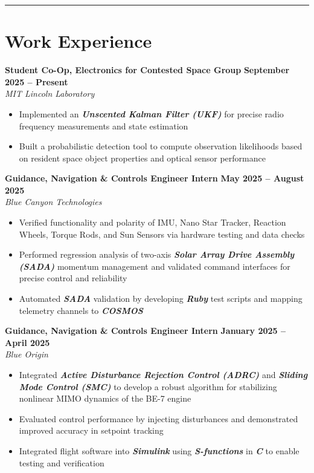 \documentclass[10pt]{article}
\newcommand{\sectionline}{\noindent\rule{\linewidth}{0.4pt}}
\begin{document}
	\sectionline
	
	\section*{Work Experience}
	
	\textbf{Student Co-Op, Electronics for Contested Space Group} \hfill \textbf{September 2025 – Present} \\
	\emph{MIT Lincoln Laboratory}
	\begin{itemize}
		\item Implemented an \textbf{\emph{Unscented Kalman Filter (UKF)}} for precise radio frequency measurements and state estimation
		\item Built a probabilistic detection tool to compute observation likelihoods based on resident space object properties and optical sensor performance
	\end{itemize}
	
	\textbf{Guidance, Navigation \& Controls Engineer Intern} \hfill \textbf{May 2025 – August 2025} \\
	\emph{Blue Canyon Technologies}
	\begin{itemize}
		\item Verified functionality and polarity of IMU, Nano Star Tracker, Reaction Wheels, Torque Rods, and Sun Sensors via hardware testing and data checks
		\item Performed regression analysis of two-axis \textbf{\emph{Solar Array Drive Assembly (SADA)}} momentum management and validated command interfaces for precise control and reliability
		\item Automated \textbf{\emph{SADA}} validation by developing \textbf{\emph{Ruby}} test scripts and mapping telemetry channels to \textbf{\emph{COSMOS}}
	\end{itemize}
	
	\textbf{Guidance, Navigation \& Controls Engineer Intern} \hfill \textbf{January 2025 – April 2025} \\
	\emph{Blue Origin}
	\begin{itemize}
		\item Integrated \textbf{\emph{Active Disturbance Rejection Control (ADRC)}} and \textbf{\emph{Sliding Mode Control (SMC)}} to develop a robust algorithm for stabilizing nonlinear MIMO dynamics of the BE-7 engine
		\item Evaluated control performance by injecting disturbances and demonstrated improved accuracy in setpoint tracking
		\item Integrated flight software into \textbf{\emph{Simulink}} using \textbf{\emph{S-functions}} in \textbf{\emph{C}} to enable testing and verification
	\end{itemize}
	
\end{document}
